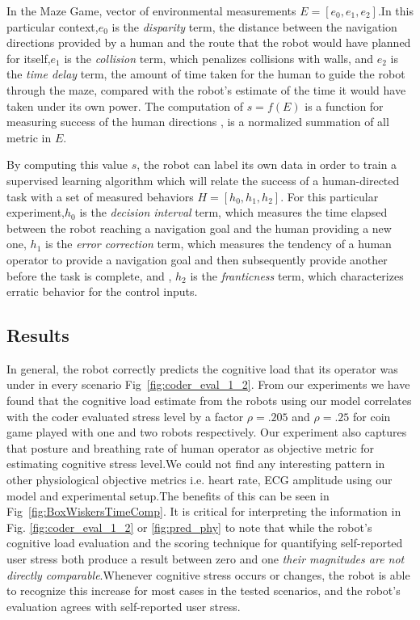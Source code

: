 \documentclass{sig-alternate}
\begin{document}
In the Maze Game,  vector of environmental measurements $E = [e_0, e_1, e_2]$.In this particular context,$e_0$ is the
\emph{disparity} term, the distance between the navigation directions provided by a human and the route that the robot
would have planned for itself,$e_1$ is the \emph{collision} term, which penalizes collisions with walls, and $e_2$ is
the \emph{time delay} term, the amount of time taken for the human to guide the robot through the maze, compared with
the robot's estimate of the time it would have taken under its own power. The computation of $s = f(E)$ is a function
for measuring success of the human directions , is a normalized summation of all metric in $E$.

By computing this value $s$, the robot can label its own data in order to train a supervised learning algorithm which
will relate the success of a human-directed task with a set of measured behaviors $H = [h_0, h_1, h_2]$. For this particular experiment,$h_0$ is the \emph{decision interval}
term, which measures the time elapsed between the robot reaching a navigation goal and the human providing a new one,
$h_1$ is the \emph{error correction} term, which measures the tendency of a human operator to provide a navigation goal
and then subsequently provide another before the task is complete, and , $h_2$ is the \emph{franticness} term, which
characterizes erratic behavior for the control inputs.

\subsection{Results} In general, the robot correctly predicts the cognitive load that its operator was under in every
scenario Fig~\ref{fig:coder_eval_1_2}. From our experiments we
have found that the cognitive load estimate from the robots using our model correlates with the coder evaluated stress
level by a factor $\rho=.205$ and $\rho=.25$ for coin game played with one and two robots respectively. Our experiment
also captures that posture and breathing rate of human operator as objective metric for estimating cognitive stress
level.We could not find any interesting pattern in other physiological objective metrics i.e. heart rate, ECG amplitude
using our model and experimental setup.The benefits of this can be seen in Fig~\ref{fig:BoxWiskersTimeComp}.  It is critical for interpreting the information in
Fig. \ref{fig:coder_eval_1_2} or \ref{fig:pred_phy} to note that while the robot's cognitive load evaluation and the
scoring technique for quantifying self-reported user stress both produce a result between zero and one \textit{their
magnitudes are not directly comparable}.Whenever cognitive stress occurs or changes, the robot is able to recognize this
increase for most cases in the tested scenarios, and the robot's evaluation agrees with self-reported user stress.
\end{document}
